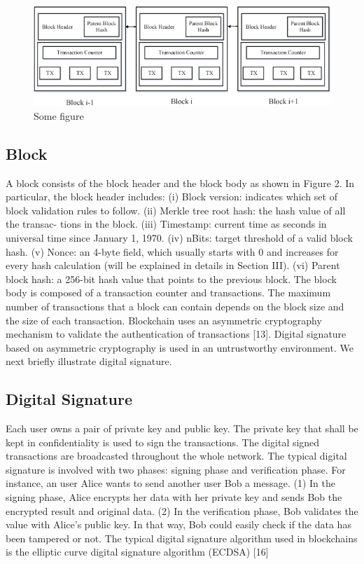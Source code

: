 \documentclass[conference]{IEEEtran}
\begin{document}
\begin{figure}
  \centering
  \includegraphics[scale=0.4]{fig.png}
  \caption{Some figure}
\end{figure}

\subsection{Block}

A block consists of the block header and the block body as
shown in Figure 2. In particular, the block header includes:
(i) Block version: indicates which set of block validation
rules to follow.
(ii) Merkle tree root hash: the hash value of all the transac-
tions in the block.
(iii) Timestamp: current time as seconds in universal time
since January 1, 1970.
(iv) nBits: target threshold of a valid block hash.
(v) Nonce: an 4-byte field, which usually starts with 0
and increases for every hash calculation (will be explained
in details in Section III).
(vi) Parent block hash: a 256-bit hash value that points to
the previous block.
The block body is composed of a transaction counter and
transactions. The maximum number of transactions that a
block can contain depends on the block size and the size of
each transaction. Blockchain uses an asymmetric cryptography
mechanism to validate the authentication of transactions [13].
Digital signature based on asymmetric cryptography is used in
an untrustworthy environment. We next briefly illustrate digital
signature.


\subsection{Digital Signature}

Each user owns a pair of private key and public key.
The private key that shall be kept in confidentiality is used
to sign the transactions. The digital signed transactions are
broadcasted throughout the whole network. The typical digital
signature is involved with two phases: signing phase and
verification phase. For instance, an user Alice wants to send
another user Bob a message. (1) In the signing phase, Alice
encrypts her data with her private key and sends Bob the
encrypted result and original data. (2) In the verification phase,
Bob validates the value with Alice’s public key. In that way,
Bob could easily check if the data has been tampered or not.
The typical digital signature algorithm used in blockchains is
the elliptic curve digital signature algorithm (ECDSA) [16]
\end{document}
